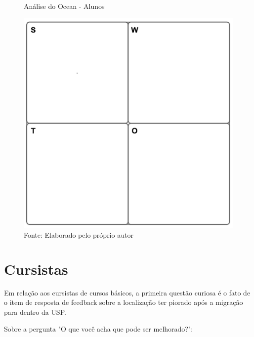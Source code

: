 \begin{figure}[H]
\caption{Análise do Ocean - Alunos}
\centerline{\includegraphics[scale=0.75]{img/generalswot}}
\label{fig:swotalunos}
\caption* {Fonte: Elaborado pelo próprio autor}
\end{figure}

\section{Cursistas}

Em relação aos cursistas de cursos básicos, a primeira questão curiosa é o fato de o item de resposta de feedback sobre a localização ter piorado após a migração para dentro da USP.

Sobre a pergunta "O que você acha que pode ser melhorado?":

